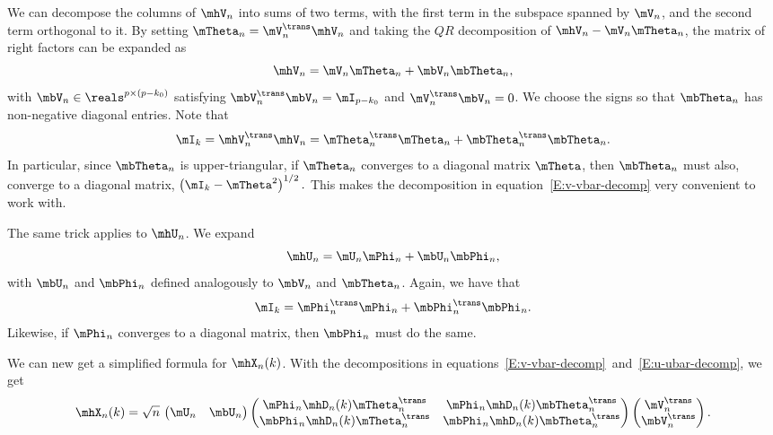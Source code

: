 We can decompose the columns of $\mhV_n$ into sums of two terms, with the first term in the subspace spanned by $\mV_n$, and the second term orthogonal
to it.  By setting $\mTheta_n = \mV_n^\trans \mhV_n$ and 
taking the $QR$ decomposition of $\mhV_n - \mV_n \mTheta_n$, the matrix of right factors can be expanded as
\begin{equation}\label{E:v-vbar-decomp}
    \mhV_n = \mV_n \mTheta_n + \mbV_n \mbTheta_n,
\end{equation}
with $\mbV_n \in \reals^{p \times (p-k_0)}$  satisfying
$\mbV_n^\trans \mbV_n = \mI_{p-k_0}$ and $\mV_n^\trans \mbV_n = 0$.  We choose the signs so that $\mbTheta_n$ has non-negative diagonal entries.  Note that
\begin{equation}
    \mI_k
    =
        \mhV_n^\trans \mhV_n
        =
        \mTheta_n^\trans \mTheta_n
        +
        \mbTheta_n^\trans
        \mbTheta_n.
\end{equation}
In particular, since $\mbTheta_n$ is upper-triangular, if $\mTheta_n$ converges to a diagonal matrix $\mTheta$, then $\mbTheta_n$ must also, converge to a diagonal matrix,
\(
    \left(
        \mI_k
        -
        \mTheta^2
    \right)^{1/2}.
\)
This makes the decomposition in equation~\eqref{E:v-vbar-decomp} very
convenient to work with.

The same trick applies to $\mhU_n$.  We expand
\begin{equation}\label{E:u-ubar-decomp}
    \mhU_n = \mU_n \mPhi_n + \mbU_n \mbPhi_n,
\end{equation}
with $\mbU_n$ and $\mbPhi_n$ defined analogously to $\mbV_n$ and $\mbTheta_n$.
Again, we have that
\begin{equation}
    \mI_k
        =
        \mPhi_n^\trans \mPhi_n
        +
        \mbPhi_n^\trans
        \mbPhi_n.    
\end{equation}
Likewise, if $\mPhi_n$ converges to a diagonal matrix, then $\mbPhi_n$ must
do the same.

We can new get a simplified formula for $\mhX_n(k)$.  With the decompositions
in equations~\eqref{E:v-vbar-decomp}~and~\eqref{E:u-ubar-decomp}, we get
\begin{equation}
    \mhX_n(k)
        =
        \sqrt{n} \,
        \left(
        \begin{matrix}
            \mU_n & \mbU_n
        \end{matrix}
        \right)
        \left(
        \begin{matrix}
            \mPhi_n \mhD_n(k) \mTheta_n^\trans &
                \mPhi_n \mhD_n(k) \mbTheta_n^\trans \\
            \mbPhi_n \mhD_n(k) \mTheta_n^\trans &
                \mbPhi_n \mhD_n(k) \mbTheta_n^\trans
        \end{matrix}
        \right)
        \left(
        \begin{matrix}
            \mV_n^\trans \\
            \mbV_n^\trans
        \end{matrix}
        \right).
\end{equation}

